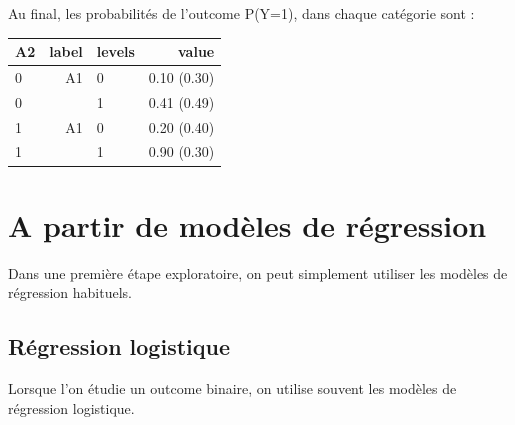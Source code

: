 \documentclass[
]{book}
\newenvironment{Shaded}{\begin{snugshade}}{\end{snugshade}}
\newcommand{\AttributeTok}[1]{\textcolor[rgb]{0.77,0.63,0.00}{#1}}
\newcommand{\CommentTok}[1]{\textcolor[rgb]{0.56,0.35,0.01}{\textit{#1}}}
\newcommand{\DecValTok}[1]{\textcolor[rgb]{0.00,0.00,0.81}{#1}}
\newcommand{\DocumentationTok}[1]{\textcolor[rgb]{0.56,0.35,0.01}{\textbf{\textit{#1}}}}
\newcommand{\FunctionTok}[1]{\textcolor[rgb]{0.00,0.00,0.00}{#1}}
\newcommand{\NormalTok}[1]{#1}
\newcommand{\OtherTok}[1]{\textcolor[rgb]{0.56,0.35,0.01}{#1}}
\newcommand{\SpecialCharTok}[1]{\textcolor[rgb]{0.00,0.00,0.00}{#1}}
\begin{document}
\begin{Shaded}
\end{Shaded}

Au final, les probabilités de l'outcome P(Y=1), dans chaque catégorie sont :

\begin{table}[!h]
\centering\begingroup\fontsize{9}{11}\selectfont

\begin{tabular}{lrlr}
\toprule
A2 & label & levels & value\\
\midrule
0 & A1 & 0 & 0.10 (0.30)\\
0 &  & 1 & 0.41 (0.49)\\
1 & A1 & 0 & 0.20 (0.40)\\
1 &  & 1 & 0.90 (0.30)\\
\bottomrule
\end{tabular}
\endgroup{}
\end{table}

\hypertarget{regression}{%
\chapter{A partir de modèles de régression}\label{regression}}

Dans une première étape exploratoire, on peut simplement utiliser les modèles de régression habituels.

\hypertarget{ruxe9gression-logistique}{%
\section{Régression logistique}\label{ruxe9gression-logistique}}

Lorsque l'on étudie un outcome binaire, on utilise souvent les modèles de régression logistique.
\end{document}
